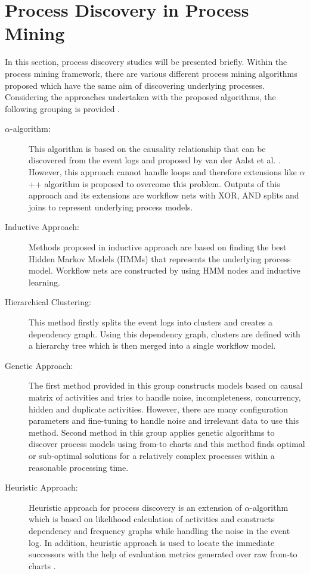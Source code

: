 \section{Process Discovery in Process Mining}
\label{sec:process-discovery-in-process-mining} 
In this section, process discovery studies will be presented briefly. Within the process mining framework, there are various different process mining algorithms proposed which have the same aim of discovering underlying processes. Considering the approaches undertaken with the proposed algorithms, the following grouping is provided \cite{khodabandelou2013process}.
\begin{description}
\item[$\alpha$-algorithm:] This algorithm is based on the causality relationship that can be discovered from the event logs and proposed by van der Aalst et al. \cite{van2004workflow}. However, this approach cannot handle loops and therefore extensions like $\alpha$++ algorithm \cite{de2004process} is proposed to overcome this problem. Outputs of this approach and its extensions are workflow nets with XOR, AND splits and joins to represent underlying process models.
\item[Inductive Approach:] Methods proposed in inductive approach \cite{herbst1998integrating, herbst2000dealing} are based on finding the best Hidden Markov Models (HMMs) that represents the underlying process model. Workflow nets are constructed by using HMM nodes and inductive learning.
\item[Hierarchical Clustering:] This method \cite{greco2005mining} firstly splits the event logs into clusters and creates a dependency graph. Using this dependency graph, clusters are defined with a hierarchy tree which is then merged into a single workflow model.
\item[Genetic Approach:] The first method provided in this group \cite{van2005genetic} constructs models based on causal matrix of activities and tries to handle noise, incompleteness, concurrency, hidden and duplicate activities. However, there are many configuration parameters and fine-tuning to handle noise and irrelevant data to use this method. Second method in this group \cite{esgin2010hybrid} applies genetic algorithms to discover process models using from-to charts and this method finds optimal or sub-optimal solutions for a relatively complex processes within a reasonable processing time.
\item[Heuristic Approach:]Heuristic approach for process discovery is an extension of $\alpha$-algorithm which is based on likelihood calculation of activities and constructs dependency and frequency graphs while handling the noise in the event log. In addition, heuristic approach is used to locate the immediate successors with the help of evaluation metrics generated over raw from-to charts \cite{esgin2009hybrid}.
\end{description}
 
